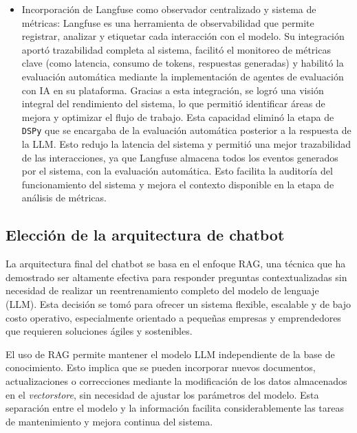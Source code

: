 \begin{itemize}
    \item Incorporación de Langfuse como observador centralizado y sistema de métricas: Langfuse es una herramienta de observabilidad que permite registrar, analizar y etiquetar cada interacción con el modelo. Su integración aportó trazabilidad completa al sistema, facilitó el monitoreo de métricas clave (como latencia, consumo de tokens, respuestas generadas) y habilitó la evaluación automática mediante la implementación de agentes de evaluación con IA en su plataforma. Gracias a esta integración, se logró una visión integral del rendimiento del sistema, lo que permitió identificar áreas de mejora y optimizar el flujo de trabajo. Esta capacidad eliminó la etapa de \texttt{DSPy} que se encargaba de la evaluación automática posterior a la respuesta de la LLM. Esto redujo la latencia del sistema y permitió una mejor trazabilidad de las interacciones, ya que Langfuse almacena todos los eventos generados por el sistema, con la evaluación automática. Esto facilita la auditoría del funcionamiento del sistema y mejora el contexto disponible en la etapa de análisis de métricas.
\end{itemize}


\subsection{Elección de la arquitectura de chatbot}

La arquitectura final del chatbot se basa en el enfoque RAG, una técnica que ha demostrado ser altamente efectiva para responder preguntas contextualizadas sin necesidad de realizar un reentrenamiento completo del modelo de lenguaje (LLM). Esta decisión se tomó para ofrecer un sistema flexible, escalable y de bajo costo operativo, especialmente orientado a pequeñas empresas y emprendedores que requieren soluciones ágiles y sostenibles.

El uso de RAG permite mantener el modelo LLM independiente de la base de conocimiento. Esto implica que se pueden incorporar nuevos documentos, actualizaciones o correcciones mediante la modificación de los datos almacenados en el \textit{vectorstore}, sin necesidad de ajustar los parámetros del modelo. Esta separación entre el modelo y la información facilita considerablemente las tareas de mantenimiento y mejora continua del sistema.

